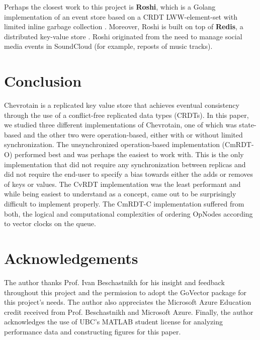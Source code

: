 \documentclass[sigconf,nonacm,10pt]{acmart}
\begin{document}
Perhaps the closest work to this project is \textbf{Roshi}, which is a Golang implementation of an event store based on a CRDT LWW-element-set with limited inline garbage collection \cite{roshi}. Moreover, Roshi is built on top of \textbf{Redis}, a distributed key-value store \cite{redis}. Roshi originated from the need to manage social media events in SoundCloud (for example, reposts of music tracks).

\section{Conclusion}
Chevrotain is a replicated key value store that achieves eventual consistency through the use of a conflict-free replicated data types (CRDTs). In this paper, we studied three different implementations of Chevrotain, one of which was state-based and the other two were operation-based, either with or without limited synchronization. The unsynchronized operation-based implementation (CmRDT-O) performed best and was perhaps the easiest to work with. This is the only implementation that did not require any synchronization between replicas and did not require the end-user to specify a bias towards either the adds or removes of keys or values. The CvRDT implementation was the least performant and while being easiest to understand as a concept, came out to be surprisingly difficult to implement properly. The CmRDT-C implementation suffered from both, the logical and computational complexities of ordering OpNodes according to vector clocks on the queue.

\section*{Acknowledgements}
The author thanks Prof. Ivan Beschastnikh for his insight and feedback throughout this project and the permission to adopt the GoVector package for this project's needs. The author also appreciates the Microsoft Azure Education credit received from Prof. Beschastnikh and Microsoft Azure. Finally, the author acknowledges the use of UBC's MATLAB student license for analyzing performance data and constructing figures for this paper.



\end{document}
